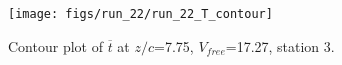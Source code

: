 \begin{figure}[H]
\centering
\texttt{[image: figs/run\_22/run\_22\_T\_contour]}
\caption{Contour plot of $\overline{t}$ at $z/c$=7.75, $V_{free}$=17.27, station 3.}
\label{fig:run_22_T_contour}
\end{figure}


